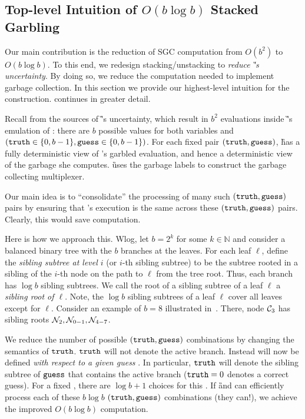 
\subsection{Top-level Intuition of $O(b \log b)$ Stacked Garbling}
\label{sec:intuition}

Our main contribution is the reduction of SGC computation from
$O(b^2)$ to $O(b \log b)$.  To this end, we redesign
stacking/unstacking to \emph{reduce \G's
uncertainty}.
%
By doing so, we reduce the computation needed to implement garbage
collection.
%
In this section we provide our highest-level intuition for the
construction.  continues in greater detail.

Recall from  the  sources of \G's
uncertainty, which result in $b^2$ evaluations inside \G's emulation
of \E: there are $b$ possible values for both variables \truth and \guess
$(\mathtt{truth} \in\{0,b-1\}, \mathtt{guess}\in\{0,b-1\})$.
%
For each fixed pair  $(\mathtt{truth},\mathtt{guess})$, \G has a fully
deterministic view of \E's garbled evaluation, and hence a deterministic view of
the garbage she computes.
\G uses the garbage labels to construct the garbage collecting multiplexer.

Our main idea is to ``consolidate'' the processing of many
such $(\mathtt{truth},\mathtt{guess})$ pairs by ensuring that \E's execution is the
same across these $(\mathtt{truth},\mathtt{guess})$ pairs.  Clearly, this would
save computation.

Here is how we approach this.
Wlog, let $b = 2^k$ for some $k \in \mathbb{N}$ and consider a balanced
binary tree with the $b$ branches at the leaves.
For each leaf $\ell$, define the {\em sibling subtree at level $i$} (or
$i$-th  sibling subtree) to be the subtree rooted in a sibling of the
$i$-th node on the path to $\ell$ from the tree root.  Thus, each branch
has $\log b$ sibling subtrees.
We call the root of a
sibling subtree of a leaf $\ell$ a {\em sibling root of $\ell$}.
Note, the $\log b$ sibling subtrees of a leaf $\ell$ 
cover all leaves except for $\ell$.
Consider an example of $b=8$ illustrated in~.
There, node $\mathcal C_3$ has sibling roots $\mathtt{\cal N}_2, \mathtt{\cal N}_{0-1},
\mathtt{\cal N}_{4-7}$.

We reduce the number of possible $(\mathtt{truth}, \mathtt{guess})$ combinations by
changing the semantics of $\mathtt{truth}$.
$\mathtt{truth}$ will not denote the active branch. Instead \truth will
now be defined \emph{with respect to a given guess} \guess.
In particular, $\mathtt{truth}$ will denote the sibling subtree of $\mathtt{guess}$
that contains the active branch ($\mathtt{truth} = 0$ denotes a correct
guess).
For a fixed \guess, there are $\log b + 1$
choices for this \truth.  If \G and \E can efficiently process each
of these $b\log b$  $(\mathtt{truth},\mathtt{guess})$ combinations  (they
can!), we achieve the improved $O(b\log b)$ computation.
